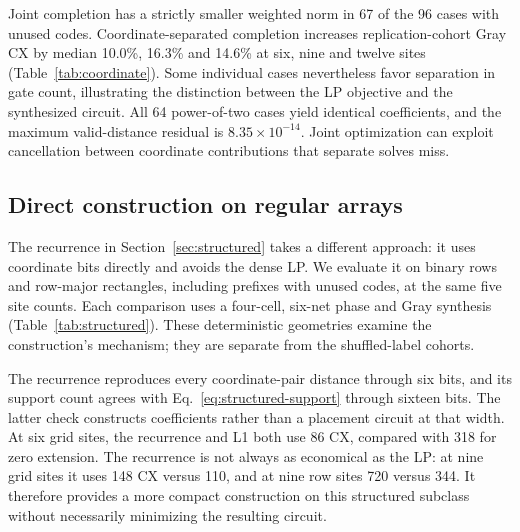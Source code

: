 \begin{table}[t]\centering\small
\caption{Coordinate-separated relative to joint L1 completion. Each row
contains 20 initial-cohort or 12 replication-cohort cases. W/T/L counts
cases with fewer/equal/more CX gates for the separated construction.
Changes and IQRs summarize paired percentages. Norm comparisons in the
text evaluate the LP objective on $c_x+c_y$. Power-of-two ties are omitted.}
\label{tab:coordinate}
\end{table}

Joint completion has a strictly smaller weighted norm in 67 of the 96
cases with unused codes. Coordinate-separated completion increases
replication-cohort Gray CX by median 10.0\%, 16.3\% and 14.6\% at six,
nine and twelve sites (Table~\ref{tab:coordinate}). Some individual cases
nevertheless favor separation in gate count, illustrating the distinction
between the LP objective and the synthesized circuit. All 64 power-of-two
cases yield identical coefficients, and the maximum valid-distance
residual is $8.35\times10^{-14}$. Joint optimization can exploit
cancellation between coordinate contributions that separate solves miss.

\subsection{Direct construction on regular arrays}
The recurrence in Section~\ref{sec:structured} takes a different approach:
it uses coordinate bits directly and avoids the dense LP. We evaluate it
on binary rows and row-major rectangles, including prefixes with unused
codes, at the same five site counts. Each comparison uses a four-cell,
six-net phase and Gray synthesis (Table~\ref{tab:structured}). These deterministic geometries examine
the construction's mechanism; they are separate from the shuffled-label
cohorts.

\begin{table}[t]\centering\small
\caption{Gray CX counts for regular-coordinate distance phases with six
nets. Each row is one deterministic geometry. All three extensions are
exact on valid pairs; the recurrence assigns distances to unused binary
coordinates. These are construction examples rather than a sampled cohort.}
\label{tab:structured}
\end{table}

The recurrence reproduces every coordinate-pair distance through six bits,
and its support count agrees with Eq.~\eqref{eq:structured-support} through
sixteen bits. The latter check constructs coefficients rather than a
placement circuit at that width. At six grid sites, the recurrence and L1
both use 86 CX, compared with 318 for zero extension. The recurrence is not
always as economical as the LP: at nine grid sites it uses 148 CX versus
110, and at nine row sites 720 versus 344. It therefore provides a more
compact construction on this structured subclass without necessarily
minimizing the resulting circuit.
